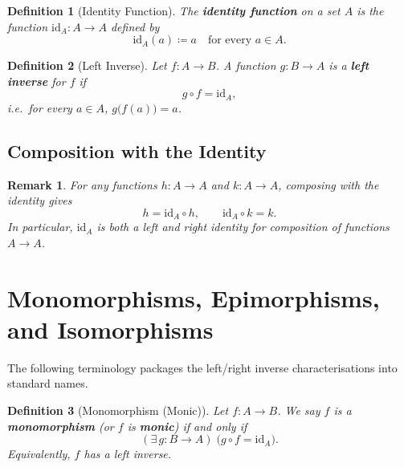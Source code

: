 \documentclass[11pt]{article}
\theoremstyle{defstyle}
\newtheorem{definition}{Definition}[section]
\theoremstyle{thmstyle}
\theoremstyle{notstyle}
\newtheorem*{remark}{Remark}
\theoremstyle{cautionstyle}
\newcommand{\id}{\mathrm{id}}
\begin{document}
\begin{defbox}
\begin{definition}[Identity Function]
The \textbf{identity function} on a set $A$ is the function $\id_A \colon A \to A$
defined by
\[
  \id_A(a) \coloneqq a \quad \text{for every } a \in A.
\]
\end{definition}
\end{defbox}

\begin{defbox}
\begin{definition}[Left Inverse]
Let $f\colon A \to B$. A function $g\colon B \to A$ is a \textbf{left inverse} for $f$
if
\[
  g \circ f = \id_A,
\]
i.e.\ for every $a \in A$, $g\bigl(f(a)\bigr) = a$.
\end{definition}
\end{defbox}
\newpage

\subsection{Composition with the Identity}
\begin{notebox}
\begin{remark}
For any functions $h\colon A \to A$ and $k\colon A \to A$, composing with the identity
gives
\[
  h = \id_A \circ h, \qquad \id_A \circ k = k.
\]
In particular, $\id_A$ is both a left and right identity for composition of functions
$A \to A$.
\end{remark}
\end{notebox}

\section{Monomorphisms, Epimorphisms, and Isomorphisms}

The following terminology packages the left/right inverse characterisations into
standard names.

\begin{defbox}
\begin{definition}[Monomorphism (Monic)]
Let $f\colon A \to B$. We say $f$ is a \textbf{monomorphism} (or $f$ is \textbf{monic})
if and only if
\[
  (\exists\, g\colon B \to A)\;\bigl(g \circ f = \id_A\bigr).
\]
Equivalently, $f$ has a left inverse.
\end{definition}
\end{defbox}
\end{document}
